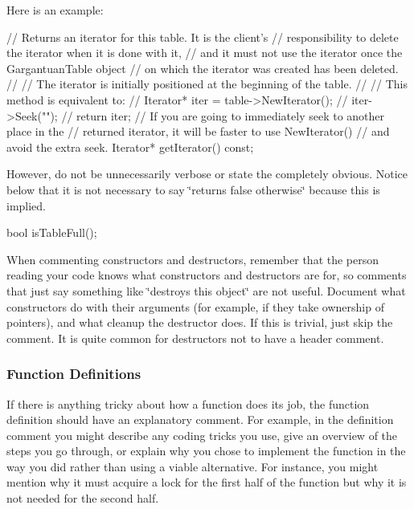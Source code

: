Here is an example\+:


\begin{DoxyCode}
\textcolor{comment}{// Returns an iterator for this table.  It is the client's}
\textcolor{comment}{// responsibility to delete the iterator when it is done with it,}
\textcolor{comment}{// and it must not use the iterator once the GargantuanTable object}
\textcolor{comment}{// on which the iterator was created has been deleted.}
\textcolor{comment}{//}
\textcolor{comment}{// The iterator is initially positioned at the beginning of the table.}
\textcolor{comment}{//}
\textcolor{comment}{// This method is equivalent to:}
\textcolor{comment}{//    Iterator* iter = table->NewIterator();}
\textcolor{comment}{//    iter->Seek("");}
\textcolor{comment}{//    return iter;}
\textcolor{comment}{// If you are going to immediately seek to another place in the}
\textcolor{comment}{// returned iterator, it will be faster to use NewIterator()}
\textcolor{comment}{// and avoid the extra seek.}
Iterator* getIterator() \textcolor{keyword}{const};
\end{DoxyCode}


However, do not be unnecessarily verbose or state the completely obvious. Notice below that it is not necessary to say \char`\"{}returns false otherwise\char`\"{} because this is implied.


\begin{DoxyCode}
\textcolor{keywordtype}{bool} isTableFull();
\end{DoxyCode}


When commenting constructors and destructors, remember that the person reading your code knows what constructors and destructors are for, so comments that just say something like \char`\"{}destroys this object\char`\"{} are not useful. Document what constructors do with their arguments (for example, if they take ownership of pointers), and what cleanup the destructor does. If this is trivial, just skip the comment. It is quite common for destructors not to have a header comment.

\subsubsection*{Function Definitions}

If there is anything tricky about how a function does its job, the function definition should have an explanatory comment. For example, in the definition comment you might describe any coding tricks you use, give an overview of the steps you go through, or explain why you chose to implement the function in the way you did rather than using a viable alternative. For instance, you might mention why it must acquire a lock for the first half of the function but why it is not needed for the second half.

